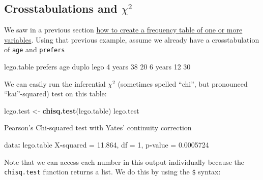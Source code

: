 \documentclass[]{article}
\newenvironment{Shaded}{\begin{snugshade}}{\end{snugshade}}
\newcommand{\CommentTok}[1]{\textcolor[rgb]{0.56,0.35,0.01}{\textit{#1}}}
\newcommand{\DecValTok}[1]{\textcolor[rgb]{0.00,0.00,0.81}{#1}}
\newcommand{\FloatTok}[1]{\textcolor[rgb]{0.00,0.00,0.81}{#1}}
\newcommand{\KeywordTok}[1]{\textcolor[rgb]{0.13,0.29,0.53}{\textbf{#1}}}
\newcommand{\NormalTok}[1]{#1}
\newcommand{\OperatorTok}[1]{\textcolor[rgb]{0.81,0.36,0.00}{\textbf{#1}}}
\newcommand{\StringTok}[1]{\textcolor[rgb]{0.31,0.60,0.02}{#1}}
\begin{document}
\hypertarget{crosstabs}{%
\subsection*{\texorpdfstring{Crosstabulations and \(\chi^2\)}{Crosstabulations and \textbackslash{}chi\^{}2}}\label{crosstabs}}

We saw in a previous section
\protect\hyperlink{frequency-tables}{how to create a frequency table of one or more variables}.
Using that previous example, assume we already have a crosstabulation of \texttt{age}
and \texttt{prefers}

\begin{Shaded}
\begin{Highlighting}[]
\NormalTok{lego.table}
\NormalTok{         prefers}
\NormalTok{age       duplo lego}
  \DecValTok{4}\NormalTok{ years    }\DecValTok{38}   \DecValTok{20}
  \DecValTok{6}\NormalTok{ years    }\DecValTok{12}   \DecValTok{30}
\end{Highlighting}
\end{Shaded}

We can easily run the inferential \(\chi^2\) (sometimes spelled ``chi'', but
pronounced ``kai''-squared) test on this table:

\begin{Shaded}
\begin{Highlighting}[]
\NormalTok{lego.test <-}\StringTok{ }\KeywordTok{chisq.test}\NormalTok{(lego.table)}
\NormalTok{lego.test}

\NormalTok{    Pearson}\StringTok{'s Chi-squared test with Yates'}\NormalTok{ continuity correction}

\NormalTok{data}\OperatorTok{:}\StringTok{  }\NormalTok{lego.table}
\NormalTok{X}\OperatorTok{-}\NormalTok{squared =}\StringTok{ }\FloatTok{11.864}\NormalTok{, df =}\StringTok{ }\DecValTok{1}\NormalTok{, p}\OperatorTok{-}\NormalTok{value =}\StringTok{ }\FloatTok{0.0005724}
\end{Highlighting}
\end{Shaded}

Note that we can access each number in this output individually because the
\texttt{chisq.test} function returns a list. We do this by using the \texttt{\$} syntax:

\begin{Shaded}
\end{Shaded}
\end{document}

